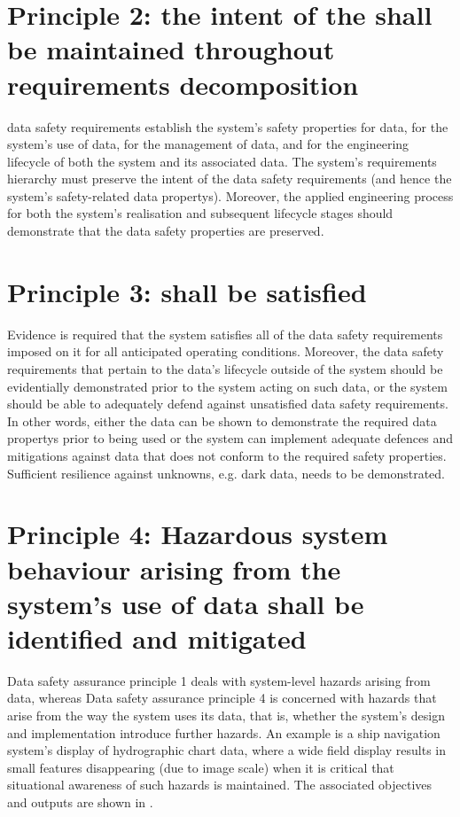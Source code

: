 \section{Principle 2: the intent of the  shall be maintained throughout requirements decomposition}
\Glspl{data safety requirement} establish the system's safety properties for data, for the system's use of data, for the management of data, and for the engineering lifecycle of both the system and its associated data. The system's requirements hierarchy must preserve the intent of the \glspl{data safety requirement} (and hence the system's safety-related \glspl{data property}). Moreover, the applied engineering process for both the system's realisation and subsequent lifecycle stages should demonstrate that the data safety properties are preserved. 
\section{Principle 3:  shall be satisfied}
Evidence is required that the system satisfies all of the \glspl{data safety requirement} imposed on it for all anticipated operating conditions. Moreover, the \glspl{data safety requirement} that pertain to the data's lifecycle outside of the system should be evidentially demonstrated prior to the system acting on such data, or the system should be able to adequately defend against unsatisfied \glspl{data safety requirement}. In other words, either the data can be shown to demonstrate the required \glspl{data property} prior to being used or the system can implement adequate defences and \glspl{mitigation} against data that does not conform to the required safety properties.  Sufficient resilience against unknowns, e.g. dark data, needs to be demonstrated.
\section{Principle 4: Hazardous system behaviour arising from the system's use of data shall be identified and mitigated}
Data safety assurance principle 1 deals with system-level hazards arising from data, whereas Data safety assurance principle 4 is concerned with hazards that arise from the way the system uses its data, that is, whether the system's design and implementation introduce further hazards. An example is a ship navigation system's display of hydrographic chart data, where a wide field display results in small features disappearing (due to image scale) when it is critical that situational awareness of such hazards is maintained. The associated objectives and outputs are shown in .

